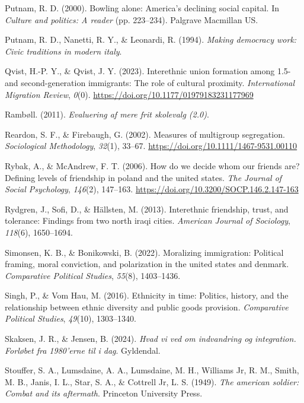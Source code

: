 \documentclass[
]{book}
\newlength{\cslhangindent}
\newenvironment{CSLReferences}[2] %
 {\begin{list}{}{%
  \setlength{\itemindent}{0pt}
  \setlength{\leftmargin}{0pt}
  \setlength{\parsep}{0pt}
  \ifodd #1
   \setlength{\leftmargin}{\cslhangindent}
   \setlength{\itemindent}{-1\cslhangindent}
  \fi
  \setlength{\itemsep}{#2\baselineskip}}}
 {\end{list}}
\begin{document}
\begin{CSLReferences}{1}{0}
Putnam, R. D. (2000). Bowling alone: America's declining social capital. In \emph{Culture and politics: A reader} (pp. 223--234). Palgrave Macmillan US.

Putnam, R. D., Nanetti, R. Y., \& Leonardi, R. (1994). \emph{Making democracy work: Civic traditions in modern italy}.

Qvist, H.-P. Y., \& Qvist, J. Y. (2023). Interethnic union formation among 1.5- and second-generation immigrants: The role of cultural proximity. \emph{International Migration Review}, \emph{0}(0). \url{https://doi.org/10.1177/01979183231177969}

Rambøll. (2011). \emph{Evaluering af mere frit skolevalg (2.0)}.

Reardon, S. F., \& Firebaugh, G. (2002). Measures of multigroup segregation. \emph{Sociological Methodology}, \emph{32}(1), 33--67. \url{https://doi.org/10.1111/1467-9531.00110}

Rybak, A., \& McAndrew, F. T. (2006). How do we decide whom our friends are? Defining levels of friendship in poland and the united states. \emph{The Journal of Social Psychology}, \emph{146}(2), 147--163. \url{https://doi.org/10.3200/SOCP.146.2.147-163}

Rydgren, J., Sofi, D., \& Hällsten, M. (2013). Interethnic friendship, trust, and tolerance: Findings from two north iraqi cities. \emph{American Journal of Sociology}, \emph{118}(6), 1650--1694.

Simonsen, K. B., \& Bonikowski, B. (2022). Moralizing immigration: Political framing, moral conviction, and polarization in the united states and denmark. \emph{Comparative Political Studies}, \emph{55}(8), 1403--1436.

Singh, P., \& Vom Hau, M. (2016). Ethnicity in time: Politics, history, and the relationship between ethnic diversity and public goods provision. \emph{Comparative Political Studies}, \emph{49}(10), 1303--1340.

Skaksen, J. R., \& Jensen, B. (2024). \emph{Hvad vi ved om indvandring og integration. Forløbet fra 1980'erne til i dag}. Gyldendal.

Stouffer, S. A., Lumsdaine, A. A., Lumsdaine, M. H., Williams Jr, R. M., Smith, M. B., Janis, I. L., Star, S. A., \& Cottrell Jr, L. S. (1949). \emph{The american soldier: Combat and its aftermath}. Princeton University Press.


\end{CSLReferences}
\end{document}
